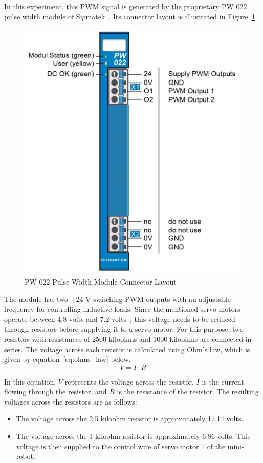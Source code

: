 \documentclass[MMR,Master,english]{style/twbook}
\begin{document}
\noindent In this experiment, this PWM signal is generated by the proprietary PW 022 pulse width module of Sigmatek~\cite{DigitalOutputSIGMATEK}. Its connector layout is illustrated in Figure~\ref{fig:pw022_connectors}.

\begin{figure}[H]
	\centering
	\includegraphics[width=0.5\columnwidth]{img/experiment/pw022_connectors.png}
	\caption[PW 022 Pulse Width Module Connector Layout]{PW 022 Pulse Width Module Connector Layout~\cite{DigitalOutputSIGMATEK}}
	\label{fig:pw022_connectors}
\end{figure}

\noindent The module has two +24 V switching PWM outputs with an adjustable frequency for controlling inductive loads. Since the mentioned servo motors operate between 4.8 volts and 7.2 volts~\cite{MG996RServoMotor}, this voltage needs to be reduced through resistors before supplying it to a servo motor. For this purpose, two resistors with resistances of 2500 kiloohms and 1000 kiloohms are connected in series. The voltage across each resistor is calculated using Ohm's law, which is given by equation~\ref{eq:ohms_law} below.
\begin{equation}
	\label{eq:ohms_law}
	V = I \cdot R
\end{equation}

\noindent In this equation, \(V\) represents the voltage across the resistor, \(I\) is the current flowing through the resistor, and \(R\) is the resistance of the resistor. The resulting voltages across the resistors are as follows:

\begin{itemize}
	\item The voltage across the 2.5 kiloohm resistor is approximately 17.14 volts.
	\item The voltage across the 1 kiloohm resistor is approximately 6.86 volts. This voltage is then supplied to the control wire of servo motor 1 of the mini-robot.
\end{itemize}
\end{document}
